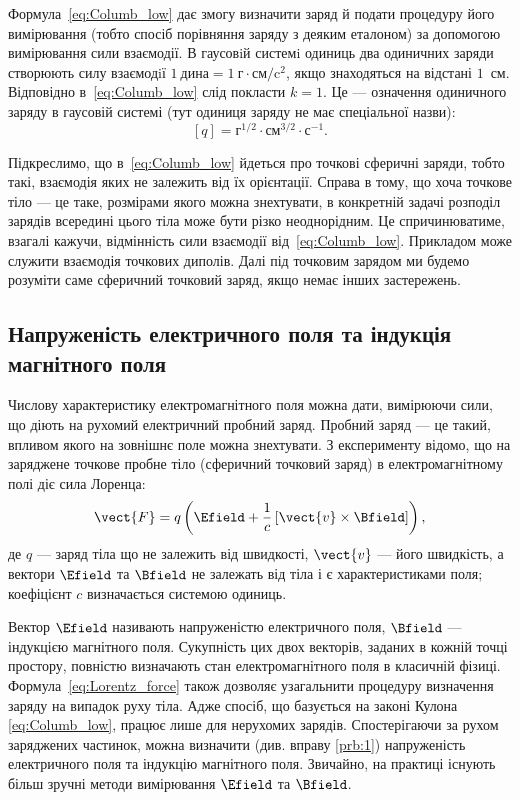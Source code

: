Формула~\eqref{eq:Columb_low} дає змогу визначити заряд й подати процедуру його
вимірювання (тобто спосіб порівняння заряду з деяким еталоном) за
допомогою вимірювання сили взаємодії. В гаусовiй системi одиниць два
одиничних заряди створюють силу взаємодiї $1\ \text{дина} = 1\ \text{г}\cdot\text{см} / \text{c}^2$,
якщо знаходяться на відстані $1$~см. Відповідно в~\eqref{eq:Columb_low} слід покласти $k=1$. Це --- означення
одиничного заряду в гаусовій системі (тут одиниця заряду не має спеціальної назви):
\begin{equation*}
	\left[q\right] = \text{г}^{1/2}\cdot\text{см}^{3/2}\cdot\text{с}^{-1}.
\end{equation*}

Підкреслимо, що в~\eqref{eq:Columb_low} йдеться про точкові сферичні заряди, тобто
такі, взаємодія яких не залежить від їх орієнтації. Справа в тому, що хоча
точкове тіло --- це таке, розмірами якого можна знехтувати, в конкретній задачі
розподіл зарядів всередині цього тіла може бути різко неоднорідним. Це
спричинюватиме, взагалі кажучи, відмінність сили взаємодії від~\eqref{eq:Columb_low}.
Прикладом може служити взаємодія точкових диполів. Далі під точковим
зарядом ми будемо розуміти саме сферичний точковий заряд, якщо немає
інших застережень.

\subsection*{Напруженість електричного поля та індукція магнітного поля}

Числову характеристику електромагнітного поля можна дати,
вимірюючи сили, що діють на рухомий електричний пробний заряд. Пробний
заряд --- це такий, впливом якого на зовнішнє поле можна знехтувати.
З експерименту відомо, що на заряджене точкове пробне тіло (сферичний
точковий заряд) в електромагнітному полі діє сила Лоренца:
\begin{equation}\label{eq:Lorentz_force}
	\vect{F} = q\left( \Efield + \frac1c \left[ \vect{v}\times\Bfield\right] \right),
\end{equation}
де $q$ --- заряд тіла що не залежить від швидкості, $\vect{v}$ --- його швидкість, а вектори $\Efield$
та $\Bfield$ не залежать від тіла і є характеристиками поля; коефіцієнт $c$ визначається системою одиниць.

Вектор $\Efield$ називають напруженістю електричного поля, $\Bfield$ --- індукцією
магнітного поля. Сукупність цих двох векторів, заданих в кожній точці
простору, повністю визначають стан електромагнітного поля в класичній
фізиці. Формула~\eqref{eq:Lorentz_force} також дозволяє узагальнити процедуру визначення
заряду на випадок руху тіла. Адже спосіб, що базується на законі Кулона
\eqref{eq:Columb_low}, працює лише для нерухомих зарядів.
Спостерігаючи за рухом заряджених частинок, можна визначити (див. вправу \ref{prb:1}) напруженість електричного поля та індукцію магнітного поля.
Звичайно, на практиці існують більш зручні методи вимірювання $\Efield$ та $\Bfield$.

